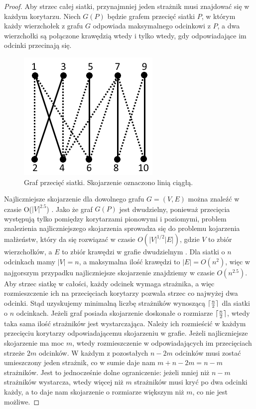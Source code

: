 \documentclass[brudnopis]{xmgr}
\DeclarePairedDelimiter\ceil{\lceil}{\rceil}
\theoremstyle{definition}
\begin{document}
\begin{proof}
Aby strzec całej siatki, przynajmniej jeden strażnik musi znajdować się w każdym korytarzu. Niech $G(P)$ będzie grafem przecięć siatki $P$, w którym każdy wierzchołek z grafu $G$ odpowiada maksymalnego odcinkowi z $P$, a dwa wierzchołki są połączone krawędzią wtedy i tylko wtedy, gdy odpowiadające im odcinki przecinają się.

 \begin{figure}[ht!]
   \centering
   \includegraphics{rysunki/graf_skojarzen.png}
   \caption{Graf przecięć siatki. Skojarzenie oznaczono linią ciągłą.}
   \label{fig:graf przeciec}
 \end{figure} 

 Najliczniejsze skojarzenie dla dowolnego grafu $G = (V,E)$ można znaleźć w czasie O($|V|^{2.5}$) \cite{even}. Jako że graf $G(P)$ jest dwudzielny, ponieważ przecięcia występują tylko pomiędzy korytarzami pionowymi i poziomymi, problem znalezienia najliczniejszego skojarzenia sprowadza się do problemu kojarzenia małżeństw, który da się rozwiązać w czasie $O(|V|^{1/2}|E|)$, gdzie $V$ to zbiór wierzchołków, a $E$ to zbiór krawędzi w grafie dwudzielnym \cite{even}. Dla siatki o $n$ odcinkach mamy $|V| = n$, a maksymalna ilość krawędzi to $|E| = O(n^2)$, więc w najgorszym przypadku najliczniejsze skojarzenie znajdziemy w czasie $O(n^{2.5})$.
 \\\indent Aby strzec siatkę w całości, każdy odcinek wymaga strażnika, a więc rozmieszczenie ich na przecięciach korytarzy pozwala strzec co najwyżej dwa odcinki. Stąd uzyskujemy minimalną liczbę strażników wynoszącą $\ceil{\frac{n}{2}}$ dla siatki o $n$ odcinkach. Jeżeli graf posiada skojarzenie doskonałe o rozmiarze $\ceil{\frac{n}{2}}$, wtedy taka sama ilość strażników jest wystarczająca. Należy ich rozmieścić w każdym przecięciu korytarzy odpowiadającemu skojarzeniu w grafie. Jeżeli najliczniejsze skojarzenie ma moc $m$, wtedy rozmieszczenie w odpowiadających im przecięciach strzeże $2m$ odcinków. W każdym z pozostałych $n - 2m$ odcinków musi zostać umieszczony jeden strażnik, co w sumie daje nam $m + n - 2m = n - m$ strażników. Jest to jednocześnie dolne ograniczenie: jeżeli mniej niż $n - m$ strażników wystarcza, wtedy więcej niż $m$ strażników musi kryć po dwa odcinki każdy, a to daje nam skojarzenie o rozmiarze większym niż $m$, co nie jest możliwe.
\end{proof}
\end{document}
